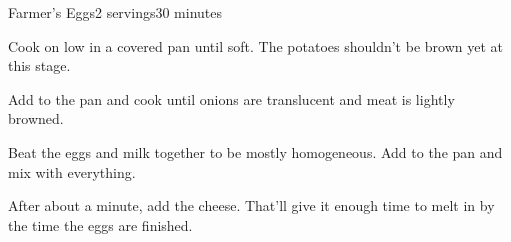\documentclass[../Cookbook.tex]{subfiles}
\begin{document}
\begin{recipe}{Farmer's Eggs}{2 servings}{30 minutes}

Cook on low in a covered pan until soft. The potatoes shouldn't be brown yet at this stage.

Add to the pan and cook until onions are translucent and meat is lightly browned.

Beat the eggs and milk together to be mostly homogeneous. 
Add to the pan and mix with everything.

After about a minute, add the cheese. 
That'll give it enough time to melt in by the time the eggs are finished.

\end{recipe}
\end{document}
